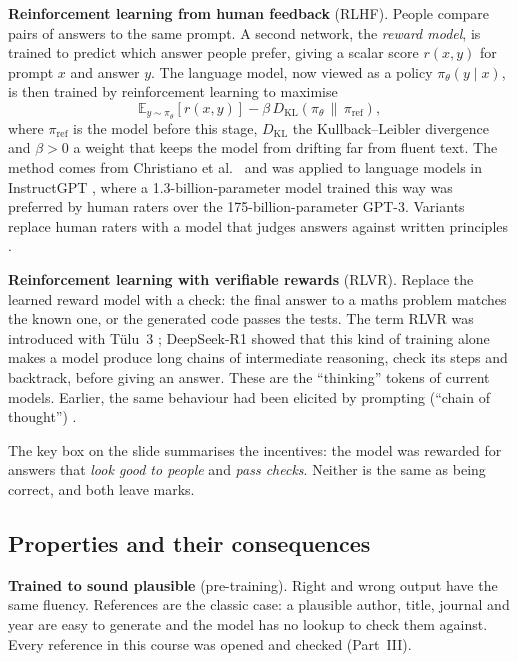 \textbf{Reinforcement learning from human feedback} (RLHF). People compare pairs of
answers to the same prompt. A second network, the \emph{reward model}, is trained to
predict which answer people prefer, giving a scalar score $r(x, y)$ for prompt $x$ and
answer $y$. The language model, now viewed as a policy $\pi_\theta(y \mid x)$, is then
trained by reinforcement learning to maximise
\begin{equation}
  \mathbb{E}_{y \sim \pi_\theta}\left[r(x, y)\right]
    - \beta\, D_{\mathrm{KL}}\!\left(\pi_\theta \,\|\, \pi_{\mathrm{ref}}\right),
\end{equation}
where $\pi_{\mathrm{ref}}$ is the model before this stage, $D_{\mathrm{KL}}$ the
Kullback--Leibler divergence and $\beta > 0$ a weight that keeps the model from drifting
far from fluent text. The method comes from Christiano et al.\  and was
applied to language models in InstructGPT , where a 1.3-billion-parameter
model trained this way was preferred by human raters over the 175-billion-parameter
GPT-3. Variants replace human raters with a model that judges answers against written
principles .

\textbf{Reinforcement learning with verifiable rewards} (RLVR). Replace the learned reward
model with a check: the final answer to a maths problem matches the known one, or the
generated code passes the tests. The term RLVR was introduced with Tülu~3
; DeepSeek-R1  showed that this kind of training alone makes a
model produce long chains of intermediate reasoning, check its steps and backtrack,
before giving an answer. These are the ``thinking'' tokens of current models. Earlier,
the same behaviour had been elicited by prompting (``chain of thought'') .

The key box on the slide summarises the incentives: the model was rewarded for answers
that \emph{look good to people} and \emph{pass checks}. Neither is the same as being
correct, and both leave marks.

\subsection{Properties and their consequences}

\textbf{Trained to sound plausible} (pre-training). Right and wrong output have the same
fluency. References are the classic case: a plausible author, title, journal and year are
easy to generate and the model has no lookup to check them against. Every reference in
this course was opened and checked (Part~III).

